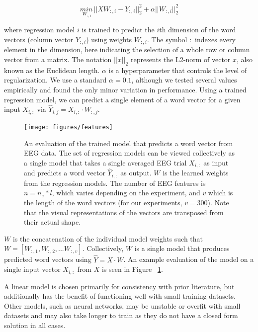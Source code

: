 \begin{equation}
  \underset{W_{:,i}}{min\,} {|| X W_{:, i} - Y_{:, i}||_2^2 + 
  \alpha ||W_{:, i}||_2^2}
  \label{eq:ridge}
\end{equation}

\noindent where regression model $i$ is trained to predict the $i$th dimension 
of the word vectors (column vector $Y_{:,i}$) using weights $W_{:,i}$. The 
symbol $:$ indexes every element in the dimension, here indicating the 
selection of a whole row or column vector from a matrix. The notation 
$||x||_2$ represents the L2-norm of vector $x$, also known as the Euclidean 
length. $\alpha$ is a hyperparameter that controls the level of regularization.  
We use a standard $\alpha = 0.1$, although we tested several values empirically 
and found the only minor variation in performance. Using a trained regression 
model, we can predict a single element of a word vector for a given input 
$X_{i,:}$ via $\hat{Y}_{i,j} = X_{i, :} \cdot W_{:,j}$.

\begin{figure}[ht]
  \centering
  \texttt{[image: figures/features]}
  \caption[Evaluation of the Trained Model]{
    An evaluation of the trained model that predicts a word vector from EEG 
    data.  The set of regression models can be viewed collectively as a single 
    model that takes a single averaged EEG trial $X_{i,:}$ as input and 
    predicts a word vector $\hat{Y}_{i,:}$ as output. $W$ is the learned 
    weights from the regression models. The number of EEG features is $n = n_e 
    * l$, which varies depending on the experiment, and $v$ which is the length 
    of the word vectors (for our experiments, $v=300$). Note that the visual 
    representations of the vectors are transposed from their actual shape.
  }
  \label{fig:features}
\end{figure}

  
$W$ is the concatenation of the individual model weights such that $W = [ 
W_{:,1}, W_{:,2}, ... W_{:,v} ]$. Collectively, $W$ is a single model that 
produces predicted word vectors using $\hat{Y} = X \cdot W$. An example 
evaluation of the model on a single input vector $X_{i,:}$ from $X$ is seen in 
Figure ~\ref{fig:features}.

A linear model is chosen primarily for consistency with prior literature, but 
additionally has the benefit of functioning well with small training datasets.
Other models, such as neural networks, may be unstable or overfit with small 
datasets and may also take longer to train as they do not have a closed form 
solution in all cases.

